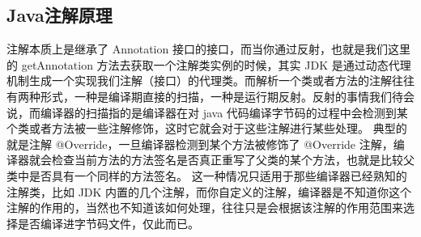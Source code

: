 \documentclass[../../../interview-questions.tex]{subfiles}
\begin{document}
\subsection{Java注解原理}

注解本质上是继承了 Annotation 接口的接口，而当你通过反射，也就是我们这里的 getAnnotation 方法去获取一个注解类实例的时候，其实 JDK 是通过动态代理机制生成一个实现我们注解（接口）的代理类。而解析一个类或者方法的注解往往有两种形式，一种是编译期直接的扫描，一种是运行期反射。反射的事情我们待会说，而编译器的扫描指的是编译器在对 java 代码编译字节码的过程中会检测到某个类或者方法被一些注解修饰，这时它就会对于这些注解进行某些处理。
典型的就是注解 @Override，一旦编译器检测到某个方法被修饰了 @Override 注解，编译器就会检查当前方法的方法签名是否真正重写了父类的某个方法，也就是比较父类中是否具有一个同样的方法签名。
这一种情况只适用于那些编译器已经熟知的注解类，比如 JDK 内置的几个注解，而你自定义的注解，编译器是不知道你这个注解的作用的，当然也不知道该如何处理，往往只是会根据该注解的作用范围来选择是否编译进字节码文件，仅此而已。
\end{document}
